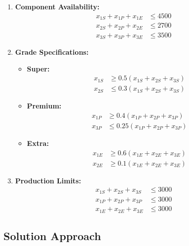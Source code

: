 \documentclass[12pt]{article}
\begin{document}
\begin{enumerate}
    \item \textbf{Component Availability:}
    \begin{align*}
    x_{1S} + x_{1P} + x_{1E} &\leq 4500 \\
    x_{2S} + x_{2P} + x_{2E} &\leq 2700 \\
    x_{3S} + x_{3P} + x_{3E} &\leq 3500
    \end{align*}
    
    \item \textbf{Grade Specifications:}
    \begin{itemize}
        \item \textbf{Super:}
        \begin{align*}
        x_{1S} &\geq 0.5(x_{1S} + x_{2S} + x_{3S}) \\
        x_{2S} &\leq 0.3(x_{1S} + x_{2S} + x_{3S})
        \end{align*}
        \item \textbf{Premium:}
        \begin{align*}
        x_{1P} &\geq 0.4(x_{1P} + x_{2P} + x_{3P}) \\
        x_{3P} &\leq 0.25(x_{1P} + x_{2P} + x_{3P})
        \end{align*}
        \item \textbf{Extra:}
        \begin{align*}
        x_{1E} &\geq 0.6(x_{1E} + x_{2E} + x_{3E}) \\
        x_{2E} &\geq 0.1(x_{1E} + x_{2E} + x_{3E})
        \end{align*}
    \end{itemize}
    
    \item \textbf{Production Limits:}
    \begin{align*}
    x_{1S} + x_{2S} + x_{3S} &\leq 3000 \\
    x_{1P} + x_{2P} + x_{3P} &\leq 3000 \\
    x_{1E} + x_{2E} + x_{3E} &\leq 3000
    \end{align*}
\end{enumerate}

\subsection*{Solution Approach}
\end{document}
